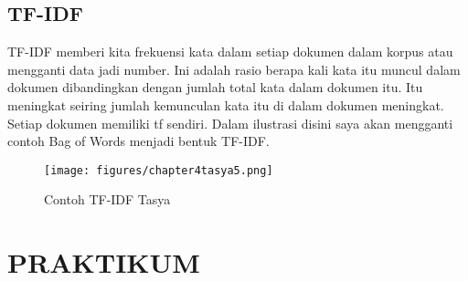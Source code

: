 \subsection{TF-IDF}
TF-IDF  memberi kita frekuensi kata dalam setiap dokumen dalam korpus atau mengganti data jadi number. Ini adalah rasio berapa kali kata itu muncul dalam dokumen dibandingkan dengan jumlah total kata dalam dokumen itu. Itu meningkat seiring jumlah kemunculan kata itu di dalam dokumen meningkat. Setiap dokumen memiliki tf sendiri. Dalam ilustrasi disini saya akan mengganti contoh Bag of Words menjadi bentuk TF-IDF.
\begin{figure}[ht]
\centering
\texttt{[image: figures/chapter4tasya5.png]}
\caption{Contoh TF-IDF Tasya}
\label{Contoh}
\end{figure}

\section{PRAKTIKUM}
